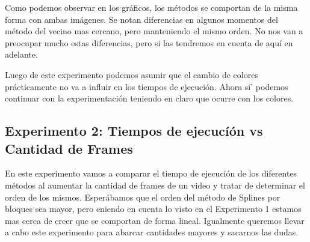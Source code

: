 \begin{figure}[ht]
	\begin{center}
	\end{center}
\end{figure}


\par Como podemos observar en los gr\'aficos, los m\'etodos se comportan de la misma forma con ambas im\'agenes. Se notan diferencias en algunos momentos del m\'etodo del vecino mas cercano, pero manteniendo el mismo orden. No nos van a preocupar mucho estas diferencias, pero si las tendremos en cuenta de aqu\'i en adelante.
\par Luego de este experimento podemos asumir que el cambio de colores pr\'acticamente no va a influir en los tiempos de ejecuci\'on. Ahora s\'i' podemos continuar con la experimentaci\'on teniendo en claro que ocurre con los colores.


\subsection{Experimento 2: Tiempos de ejecucí\'on vs Cantidad de Frames}
\par En este experimento vamos a comparar el tiempo de ejecuci\'on de los diferentes m\'etodos al aumentar la cantidad de frames de un video y tratar de determinar el orden de los mismos. Esper\'abamos que el orden del m\'etodo de Splines por bloques sea mayor, pero eniendo en cuenta lo visto en el Experimento 1 estamos mas cerca de creer que se comportan de forma lineal. Igualmente queremos llevar a cabo este experimento para abarcar cantidades mayores y sacarnos las dudas.


